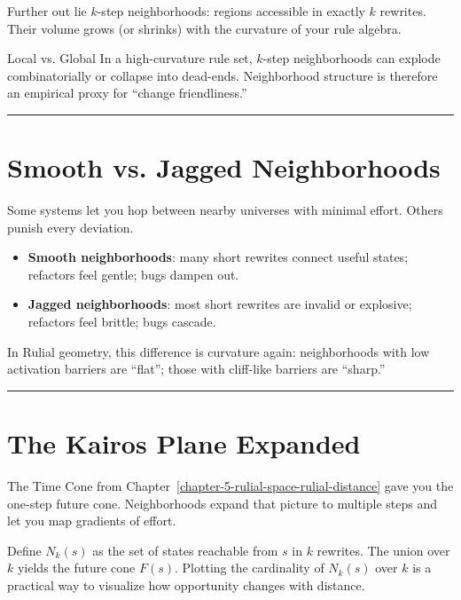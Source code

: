 Further out lie $k$-step neighborhoods: regions accessible in exactly $k$ rewrites. Their volume grows (or shrinks) with the curvature of your rule algebra.

\begin{callout}{Local vs. Global}
In a high-curvature rule set, $k$-step neighborhoods can explode combinatorially or collapse into dead-ends. Neighborhood structure is therefore an empirical proxy for “change friendliness.”
\end{callout}

\begin{center}\rule{0.5\linewidth}{0.5pt}\end{center}

\section{Smooth vs. Jagged Neighborhoods}
\label{7.3-smooth-vs-jagged}

Some systems let you hop between nearby universes with minimal effort. Others punish every deviation.

\begin{itemize}
    \item \textbf{Smooth neighborhoods}: many short rewrites connect useful states; refactors feel gentle; bugs dampen out.
    \item \textbf{Jagged neighborhoods}: most short rewrites are invalid or explosive; refactors feel brittle; bugs cascade.
\end{itemize}

In Rulial geometry, this difference is curvature again: neighborhoods with low activation barriers are “flat”; those with cliff-like barriers are “sharp.”

\begin{center}\rule{0.5\linewidth}{0.5pt}\end{center}

\section{The Kairos Plane Expanded}
\label{7.4-kairos-plane-expanded}

The Time Cone from Chapter~\ref{chapter-5-rulial-space-rulial-distance} gave you the one-step future cone. Neighborhoods expand that picture to multiple steps and let you map gradients of effort.

Define $N_k(s)$ as the set of states reachable from $s$ in $k$ rewrites. The union over $k$ yields the future cone $F(s)$. Plotting the cardinality of $N_k(s)$ over $k$ is a practical way to visualize how opportunity changes with distance.

